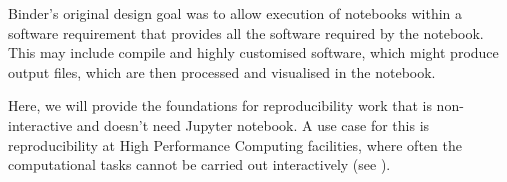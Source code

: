 \begin{task}
\begin{compactitem}
  Binder's original design goal was to allow execution of notebooks within a
  software requirement that provides all the software required by the notebook.
  This may include compile and highly customised software, which might produce
  output files, which are then processed and visualised in the notebook.

  Here, we will provide the foundations for reproducibility work that is
  non-interactive and doesn't need Jupyter notebook. A use case for this is
  reproducibility at High Performance Computing facilities, where often the
  computational tasks cannot be carried out interactively (see
  ).


  \end{compactitem}
\end{task}


%
%
%

